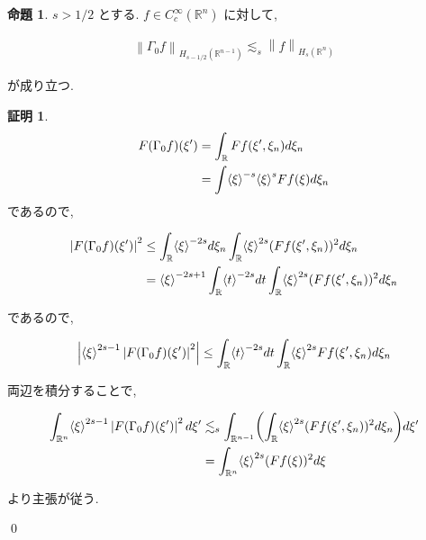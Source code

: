 \documentclass[10pt, fleqn, label-section=none]{bxjsarticle}
\theoremstyle{definition}
\newtheorem{prop}[dfn]{命題}
\newtheorem*{pf*}{証明}
\newcommand{\paren}[1]{\mleft( #1\mright )}
\newcommand{\tbra}[1]{\mleft\langle#1\mright\rangle}
\newcommand{\abs}[1]{\left|#1\right|}
\newcommand{\norm}[1]{\left\|#1\right\|}
\renewcommand{\;}{\, ; \,}
\begin{document}
\begin{prop}$s > 1/2$ とする. $f \in C_c^\infty (\mathbb R^n) $ に対して, 

\begin{align*} \norm{\Gamma_0 f}_{H_{s - 1/2}(\mathbb R^{n-1})} \lesssim_s  \norm{f}_{H_s(\mathbb R^n)}  \end{align*}

が成り立つ. 

\end{prop}
\begin{pf*}

\begin{align*} F(\Gamma_0 f) (\xi ^\prime) &= \int_{\mathbb R} Ff(\xi^\prime, \xi_n) d\xi_n  \\& = \int \tbra{\xi}^{-s} \tbra{\xi}^s Ff(\xi) d \xi_n  \end{align*}
であるので, 

\begin{align*} \abs{F(\Gamma_0 f) (\xi ^\prime)}^2 &\leq \int_{\mathbb R} \tbra{\xi}^{-2s} d \xi_n  \int_{\mathbb R} \tbra{\xi}^{2s} (Ff(\xi^\prime, \xi_n) )^2d\xi_n 
\\&= \tbra{\xi}^{-2s + 1} \int_{\mathbb R } \tbra{t}^{-2s} dt \int_{\mathbb R}  \tbra{\xi}^{2s} (Ff(\xi^\prime, \xi_n) )^2 d\xi_n    \end{align*}

であるので, 

\begin{align*} \abs{ \tbra{\xi}^{2s - 1} \abs{F(\Gamma_0 f) (\xi ^\prime)}^2} \leq  \int_{\mathbb R } \tbra{t}^{-2s} dt \int_{\mathbb R}  \tbra{\xi}^{2s} Ff(\xi^\prime, \xi_n) d\xi_n   \end{align*}

両辺を積分することで, 

\begin{align*} \int_{\mathbb R^n }\tbra{\xi}^{2s - 1}   \abs{F(\Gamma_0 f) (\xi ^\prime)}^2  d\xi^\prime &\lesssim_s \int_{\mathbb R^{n-1}}\paren{  \int_{\mathbb R}  \tbra{\xi}^{2s} (Ff(\xi^\prime, \xi_n))^2 d\xi_n  } d\xi^\prime 
\\&= \int_{\mathbb R^n} \tbra{\xi}^{2s} (Ff(\xi))^2 d\xi   \end{align*}

より主張が従う. 

\qed
\end{pf*}
\end{document}

